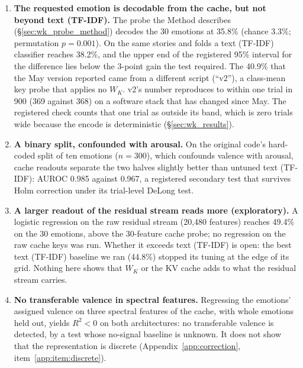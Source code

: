 \documentclass[11pt,a4paper]{article}
\begin{document}
\begin{enumerate}[nosep]
    \item \textbf{The requested emotion is decodable from the cache, but not beyond text (TF-IDF).} The probe the Method describes (\S\ref{sec:wk_probe_method}) decodes the 30 emotions at 35.8\% (chance 3.3\%; permutation $p = 0.001$). On the same stories and folds a text (TF-IDF) classifier reaches 38.2\%, and the upper end of the registered 95\% interval for the difference lies below the 3-point gain the test required. The 40.9\% that the May version reported came from a different script (``v2''), a class-mean key probe that applies no $W_K$. v2's number reproduces to within one trial in 900 (369 against 368) on a software stack that has changed since May. The registered check counts that one trial as outside its band, which is zero trials wide because the encode is deterministic (\S\ref{sec:wk_results}).

    \item \textbf{A binary split, confounded with arousal.} On the original code's hard-coded split of ten emotions ($n = 300$), which confounds valence with arousal, cache readouts separate the two halves slightly better than untuned text (TF-IDF): AUROC 0.985 against 0.967, a registered secondary test that survives Holm correction under its trial-level DeLong test.

    \item \textbf{A larger readout of the residual stream reads more (exploratory).} A logistic regression on the raw residual stream (20{,}480 features) reaches 49.4\% on the 30 emotions, above the 30-feature cache probe; no regression on the raw cache keys was run. Whether it exceeds text (TF-IDF) is open: the best text (TF-IDF) baseline we ran (44.8\%) stopped its tuning at the edge of its grid. Nothing here shows that $W_K$ or the KV cache adds to what the residual stream carries.

    \item \textbf{No transferable valence in spectral features.} Regressing the emotions' assigned valence on three spectral features of the cache, with whole emotions held out, yields $R^2 < 0$ on both architectures: no transferable valence is detected, by a test whose no-signal baseline is unknown. It does not show that the representation is discrete (Appendix~\ref{app:correction}, item~\ref{app:item:discrete}).
\end{enumerate}
\end{document}
